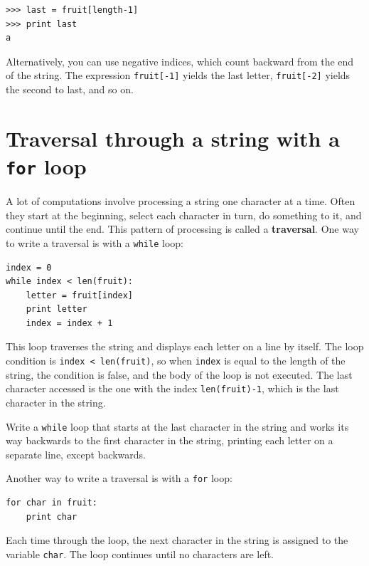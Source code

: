 \documentclass[10pt]{book}
\begin{document}
\beforeverb
\begin{verbatim}
>>> last = fruit[length-1]
>>> print last
a
\end{verbatim}
\afterverb
%
Alternatively, you can use negative indices, which count backward from
the end of the string.  The expression {\tt fruit[-1]} yields the last
letter, {\tt fruit[-2]} yields the second to last, and so on.



\section{Traversal through a string with a {\tt for} loop}
\label{for}


A lot of computations involve processing a string one character at a
time.  Often they start at the beginning, select each character in
turn, do something to it, and continue until the end.  This pattern of
processing is called a {\bf traversal}.  One way to write a traversal
is with a {\tt while} loop:

\beforeverb
\begin{verbatim}
index = 0
while index < len(fruit):
    letter = fruit[index]
    print letter
    index = index + 1
\end{verbatim}
\afterverb
%
This loop traverses the string and displays each letter on a line by
itself.  The loop condition is {\tt index < len(fruit)}, so
when {\tt index} is equal to the length of the string, the
condition is false, and the body of the loop is not executed.  The
last character accessed is the one with the index {\tt len(fruit)-1},
which is the last character in the string.

\begin{ex}
Write a {\tt while} loop that starts at the last character in the string
and works its way backwards to the first character in the string, 
printing each letter on a separate line, except backwards.
\end{ex}

Another way to write a traversal is with a {\tt for} loop:

\beforeverb
\begin{verbatim}
for char in fruit:
    print char
\end{verbatim}
\afterverb
%
Each time through the loop, the next character in the string is assigned
to the variable {\tt char}.  The loop continues until no characters are
left.
\end{document}

